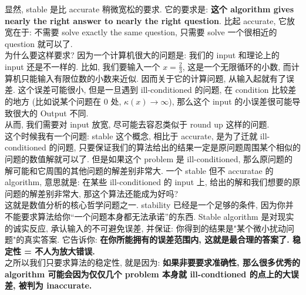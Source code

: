 \documentclass[lang=cn,11pt]{elegantbook}
\begin{document}
\begin{remark}
  显然, stable 是比 accurate 稍微宽松的要求. 它的要求是: \textbf{这个 algorithm gives nearly the right answer to nearly the right question}. 比起 accurate, 它放宽在于: 不需要 solve exactly the same question, 只需要 solve 一个很相近的 question 就可以了.\\
  
为什么要这样要求? 因为一个计算机很大的问题是: 我们的 input 和理论上的 input 还是不一样的. 比如, 我们要输入一个 $x = \frac{2}{3}$, 这是一个无限循环的小数, 而计算机只能输入有限位数的小数来近似. 因而关于它的计算问题, 从输入起就有了误差. 这个误差可能很小, 但是一旦遇到 ill-conditioned 的问题, 在 condition 比较差的地方 (比如说某个问题在 $0$ 处, $\kappa(x) \to \infty$), 那么这个 input 的小误差很可能导致很大的 Output 不同.\\

从而, 我们需要对 input 放宽, 尽可能去容忍类似于 round up 这样的问题. \\

这个时候我有一个问题: stable 这个概念, 相比于 accurate, 是为了迁就 ill-conditioned 的问题, 只要保证我们的算法给出的结果一定是原问题周围某个相似的问题的数值解就可以了. 但是如果这个 problem 是 ill-conditioned, 那么原问题的解可能和它周围的其他问题的解差别非常大. 一个 stable 但不 accuratae 的 algorithm, 意思就是: 在某些 ill-conditioned 的 input 上, 给出的解和我们想要的原问题的解差别非常大, 那这个算法还能成为好吗?\\

这就是数值分析的核心哲学问题之一. stability 已经是一个足够的条件, 因为你并不能要求算法给你“一个问题本身都无法承诺”的东西. Stable algorithm 是对现实的诚实反应, 承认输入的不可避免误差, 并保证: 你得到的结果是"某个微小扰动问题"的真实答案. 它告诉你: \textbf{在你所能拥有的误差范围内, 这就是最合理的答案了. 稳定性 = 不人为放大错误.}\\ 
之所以我们只要求算法的稳定性, 就是因为: \textbf{如果非要要求准确性, 那么很多优秀的 algorithm 可能会因为仅仅几个 problem 本身就 ill-condtioned 的点上的大误差, 被判为 inaccurate. }  
\end{remark}
\end{document}
